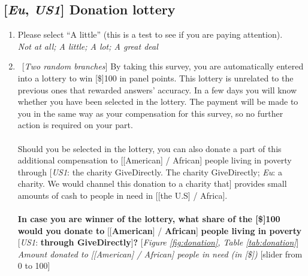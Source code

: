 \subsection*{[\textit{Eu}, \textit{US1}] Donation lottery}
\begin{enumerate}[resume] \item Please select ``A little'' (this is a test to see if you are paying attention).
\\ \textit{Not at all; A little; A lot; A great deal}
\item ~[\textit{Two random branches}] \label{q:donation} By taking this survey, you are automatically entered into a lottery to win [\$]100 in panel points. This lottery is unrelated to the previous ones that rewarded answers' accuracy. In a few days you will know whether you have been selected in the lottery. The payment will be made to you in the same way as your compensation for this survey, so no further action is required on your part.\\
\\
Should you be selected in the lottery, you can also donate a part of this additional compensation to [[American] / African] people living in poverty through [\textit{US1}: the charity GiveDirectly. The charity GiveDirectly; \textit{Eu}: a charity. We would channel this donation to a charity that] provides small amounts of cash to people in need in [[the U.S] / Africa].\\
\\
\textbf{In case you are winner of the lottery, what share of the [\$]100 would you donate to} [[\textbf{American}] / \textbf{African}] \textbf{people living in poverty} [\textit{US1}: \textbf{through GiveDirectly}]\textbf{?}  [\textit{Figure \ref{fig:donation}, Table \ref{tab:donation}}]
\\ \textit{Amount donated to [[American] / African] people in need (in [\$])} [slider from 0 to 100]
\end{enumerate}

